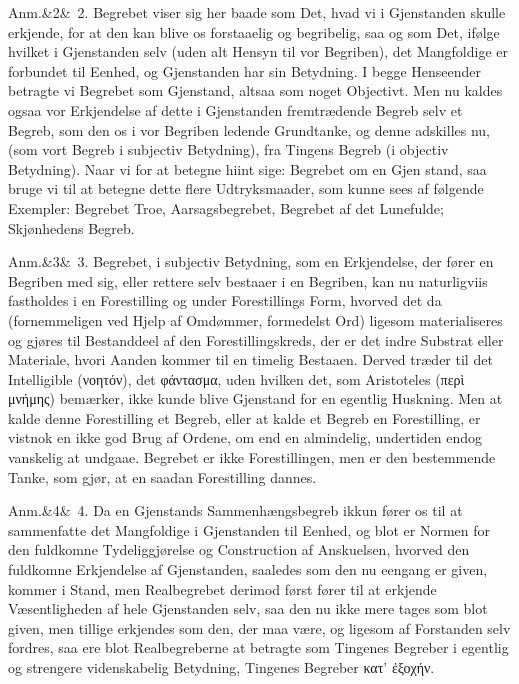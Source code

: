 \documentclass[12pt]{book}
\makeatletter
\def\sperr#1{#1}%
\def\textit#1{#1}%
\def\emph#1{#1}%
\newcommand{\sperr}[1]{\textls[180]{#1}}
\newcommand{\umph}[2][misc]{%
  \@ifundefined{umph@#1@on}{#2}{\emph{#2}}}
\newcommand{\anm}[1]{%
  \par\vspace{0.5\baselineskip}%
  \noindent\hspace{\parindent}\sperr{Anm.}\ifx&#1&\else~\textit{#1}.\fi
  \enspace\ignorespaces
}
\newcommand{\opage}[1]{\marginnote{\footnotesize\textit{[#1]}}}
\makeatother
\begin{document}
\anm{2} Begrebet viser sig her baade som Det, hvad vi i Gjenstanden skulle
erkjende, for at den kan blive os forstaaelig og begribelig, saa og som Det,
ifølge hvilket i Gjenstanden selv (uden alt Hensyn til vor Begriben), det
Mangfoldige er forbundet til Eenhed, og Gjenstanden har sin Betydning. I begge
Henseender betragte vi Begrebet som \umph[schwab]{intellectuel} Gjenstand, altsaa som noget
Objectivt. Men nu kaldes ogsaa vor Erkjendelse af dette i Gjenstanden
fremtrædende Begreb selv et Begreb, som den os i vor Begriben ledende
Grundtanke, og denne adskilles nu, (som vort Begreb i subjectiv Betydning), fra
Tingens Begreb (i objectiv Betydning). Naar vi for at betegne hiint sige:
Begrebet om en Gjen%
\opage{77}stand, saa bruge vi til at betegne dette flere Udtryksmaader, som kunne sees af
følgende Exempler: Begrebet Troe, Aarsagsbegrebet, Begrebet af det Lunefulde;
Skjønhedens Begreb.

\anm{3} Begrebet, i subjectiv Betydning, som en Erkjendelse, der fører en
Begriben med sig, eller rettere selv bestaaer i en Begriben, kan nu naturligviis
fastholdes i en Forestilling og under Forestillings Form, hvorved det da
(fornemmeligen ved Hjelp af Omdømmer, formedelst Ord) ligesom materialiseres og
gjøres til Bestanddeel af den Forestillingskreds, der er det indre Substrat eller
Materiale, hvori Aanden kommer til en timelig Bestaaen. Derved træder til det
Intelligible (\textit{νοητόν}), det \textit{φάντασμα}, uden hvilken det, som
Aristoteles (\textit{περὶ μνήμης}) bemærker, ikke kunde blive Gjenstand for en
egentlig Huskning. Men at kalde denne Forestilling et Begreb, eller at kalde et
Begreb en Forestilling, er vistnok en ikke god Brug af Ordene, om end en
almindelig, undertiden endog vanskelig at undgaae. Begrebet er ikke
Forestillingen, men er den bestemmende Tanke, som gjør, at en saadan Forestilling
dannes.

\anm{4} Da en Gjenstands Sammenhængsbegreb ikkun fører os til at sammenfatte det
Mangfoldige i Gjenstanden til Eenhed, og blot er Normen for den fuldkomne
Tydeliggjørelse og Construction af Anskuelsen, hvorved den fuldkomne Erkjendelse
af Gjenstanden, saaledes som den nu eengang \emph{er given}, kommer i Stand,
\opage{78} men Realbegrebet derimod først fører til at erkjende Væsentligheden af hele
Gjenstanden selv, saa den nu ikke mere tages som blot given, men tillige
erkjendes som den, der maa være, og ligesom af Forstanden selv fordres, saa ere
blot Realbegreberne at betragte som Tingenes Begreber i egentlig og strengere
videnskabelig Betydning, Tingenes Begreber \textit{κατ' ἐξοχήν}.
\end{document}
